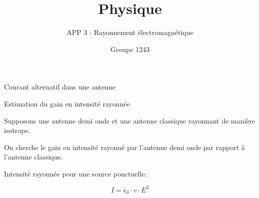 \documentclass[pdf]{beamer}
\title{Physique}
\subtitle{APP 3 : Rayonnement électromagnétique}
\author{Groupe 1243}
\begin{document}
 
 
\begin{frame} 
	\titlepage 
\end{frame}

\begin{frame}{Courant alternatif dans une antenne}

\end{frame} 
 
\begin{frame}{Estimation du gain en intensité rayonnée}

Supposons une antenne demi onde et une antenne classique rayonnant de manière isotrope.

On cherche le gain en intensité rayonné par l'antenne demi onde par rapport à l'antenne classique.

Intensité rayonnée pour une source ponctuelle:

$$ I = \epsilon_{0}\cdot v\cdot E^{2} $$

\end{frame}
 
\end{document}
